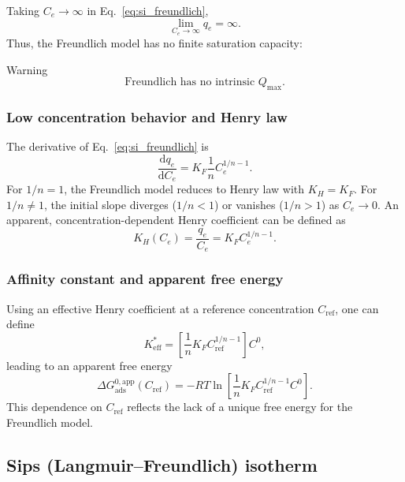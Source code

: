 \documentclass[journal=jacsat,manuscript=article]{achemso}
\begin{document}
Taking \(C_e \to \infty\) in Eq.~\eqref{eq:si_freundlich},
\begin{equation}
	\lim_{C_e \to \infty} q_e = \infty.
\end{equation}
Thus, the Freundlich model has no finite saturation capacity:
\begin{redbox}{Warning}
		\begin{equation}
		\text{Freundlich has no intrinsic } Q_{\max}.
	\end{equation}
\end{redbox}

\subsubsection{Low concentration behavior and Henry law}

The derivative of Eq.~\eqref{eq:si_freundlich} is
\begin{equation}
	\frac{\mathrm{d} q_e}{\mathrm{d} C_e}
	= K_F \frac{1}{n} C_e^{1/n - 1}.
\end{equation}
For \(1/n = 1\), the Freundlich model reduces to Henry law with
\(K_H = K_F\). For \(1/n \neq 1\), the initial slope diverges
(\(1/n < 1\)) or vanishes (\(1/n > 1\)) as \(C_e \to 0\).
An apparent, concentration-dependent Henry coefficient can be defined as
\begin{equation}
	K_H(C_e) = \frac{q_e}{C_e}
	= K_F C_e^{1/n - 1}.
\end{equation}

\subsubsection{Affinity constant and apparent free energy}

Using an effective Henry coefficient at a reference concentration
\(C_{\mathrm{ref}}\), one can define
\begin{equation}
	K_{\mathrm{eff}}^{\ast}
	= \left[\frac{1}{n} K_F C_{\mathrm{ref}}^{1/n - 1}\right] C^0,
\end{equation}
leading to an apparent free energy
\begin{equation}
	\Delta G_{\mathrm{ads}}^{0,\mathrm{app}}(C_{\mathrm{ref}})
	= - R T \ln\!\left[
	\frac{1}{n} K_F C_{\mathrm{ref}}^{1/n - 1} C^0 \right].
\end{equation}
This dependence on \(C_{\mathrm{ref}}\) reflects the lack of a unique
free energy for the Freundlich model.

\subsection{Sips (Langmuir--Freundlich) isotherm}
\label{sec:si_sips}
\end{document}
